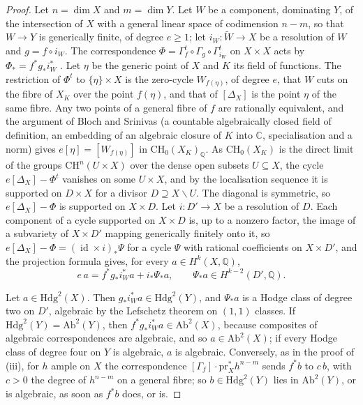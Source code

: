 \documentclass[11pt,reqno]{amsart}
\theoremstyle{plain}
\theoremstyle{definition}
\theoremstyle{remark}
\newcommand{\QQ}{\mathbb{Q}}
\newcommand{\CC}{\mathbb{C}}
\newcommand{\Hdg}{\mathrm{Hdg}}
\DeclareMathOperator{\id}{id}
\begin{document}
\begin{proof}
Let $n=\dim X$ and $m=\dim Y$. Let $W$ be a component, dominating $Y$, of the
intersection of $X$ with a general linear space of codimension $n-m$, so that
$W\to Y$ is generically finite, of degree $e\ge1$; let
$i_{W}\colon\widetilde W\to X$ be a resolution of $W$ \cite{Hir64} and
$g=f\circ i_{W}$. The correspondence
$\Phi=\Gamma_{f}^{t}\circ\Gamma_{g}\circ\Gamma_{i_{W}}^{t}$ on $X\times X$
acts by $\Phi_{*}=f^{*}g_{*}i_{W}^{*}$ \cite[Chapter~16]{Ful98}. Let $\eta$ be
the generic point of $X$ and $K$ its field of functions. The restriction of
$\Phi^{t}$ to $\{\eta\}\times X$ is the zero-cycle $W_{f(\eta)}$, of degree
$e$, that $W$ cuts on the fibre of $X_{K}$ over the point $f(\eta)$, and that
of $[\Delta_{X}]$ is the point $\eta$ of the same fibre. Any two points of a
general fibre of $f$ are rationally equivalent, and the argument of Bloch and
Srinivas \cite{BS83} (a countable algebraically closed field of definition,
an embedding of an algebraic closure of $K$ into $\CC$, specialisation and a
norm) gives $e[\eta]=[W_{f(\eta)}]$ in $\mathrm{CH}_{0}(X_{K})_{\QQ}$. As
$\mathrm{CH}_{0}(X_{K})$ is the direct limit of the groups
$\mathrm{CH}^{n}(U\times X)$ over the dense open subsets $U\subseteq X$, the
cycle $e[\Delta_{X}]-\Phi^{t}$ vanishes on some $U\times X$, and by the
localisation sequence \cite[Chapter~1]{Ful98} it is supported on $D\times X$
for a divisor $D\supseteq X\smallsetminus U$. The diagonal is symmetric, so
$e[\Delta_{X}]-\Phi$ is supported on $X\times D$. Let $i\colon D'\to X$ be a
resolution of $D$. Each component of a cycle supported on $X\times D$ is, up
to a nonzero factor, the image of a subvariety of $X\times D'$ mapping
generically finitely onto it, so $e[\Delta_{X}]-\Phi=(\id\times i)_{*}\Psi$
for a cycle $\Psi$ with rational coefficients on $X\times D'$, and the
projection formula gives, for every $a\in H^{k}(X,\QQ)$,
\[
  e\,a=f^{*}g_{*}i_{W}^{*}a+i_{*}\Psi_{*}a,\qquad
  \Psi_{*}a\in H^{k-2}(D',\QQ).
\]

Let $a\in\Hdg^{2}(X)$. Then $g_{*}i_{W}^{*}a\in\Hdg^{2}(Y)$, and
$\Psi_{*}a$ is a Hodge class of degree two on $D'$, algebraic by the
Lefschetz theorem on $(1,1)$ classes. If $\Hdg^{2}(Y)=\mathrm{Ab}^{2}(Y)$,
then $f^{*}g_{*}i_{W}^{*}a\in\mathrm{Ab}^{2}(X)$, because composites of
algebraic correspondences are algebraic, and so $a\in\mathrm{Ab}^{2}(X)$; if
every Hodge class of degree four on $Y$ is algebraic, $a$ is algebraic.
Conversely, as in the proof of (iii), for $h$ ample on
$X$ the correspondence $[\Gamma_{f}]\cdot\mathrm{pr}_{X}^{*}h^{n-m}$ sends
$f^{*}b$ to $c\,b$, with $c>0$ the degree of $h^{n-m}$ on a general fibre;
so $b\in\Hdg^{2}(Y)$ lies in $\mathrm{Ab}^{2}(Y)$, or is algebraic, as soon
as $f^{*}b$ does, or is.


\end{proof}
\end{document}
